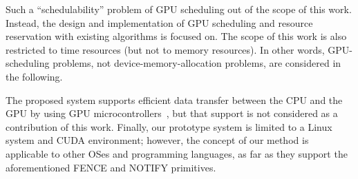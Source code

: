 Such a ``schedulability'' problem of GPU scheduling out of the scope of this work.
Instead, the design and implementation of GPU scheduling and resource reservation with existing algorithms is focused on.
The scope of this work is also restricted to time resources (but not to memory resources).
In other words, GPU-scheduling problems, not device-memory-allocation problems, are considered in the following.

The proposed system supports efficient data transfer between the CPU and the GPU by using GPU microcontrollers~\cite{fujii:icpads2013}, but that support is not considered as a contribution of this work.
Finally, our prototype system is limited to a Linux system and CUDA environment; however, the concept of our method is applicable to other OSes and programming languages, as far as they support the aforementioned FENCE and NOTIFY primitives.
